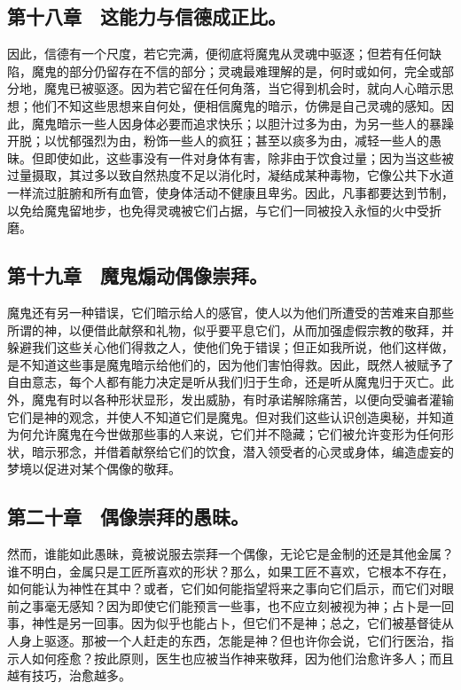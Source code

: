 \subsection{第十八章　这能力与信德成正比。}

因此，信德有一个尺度，若它完满，便彻底将魔鬼从灵魂中驱逐；但若有任何缺陷，魔鬼的部分仍留存在不信的部分；灵魂最难理解的是，何时或如何，完全或部分地，魔鬼已被驱逐。因为若它留在任何角落，当它得到机会时，就向人心暗示思想；他们不知这些思想来自何处，便相信魔鬼的暗示，仿佛是自己灵魂的感知。因此，魔鬼暗示一些人因身体必要而追求快乐；以胆汁过多为由，为另一些人的暴躁开脱；以忧郁强烈为由，粉饰一些人的疯狂；甚至以痰多为由，减轻一些人的愚昧。但即使如此，这些事没有一件对身体有害，除非由于饮食过量；因为当这些被过量摄取，其过多以致自然热度不足以消化时，凝结成某种毒物，它像公共下水道一样流过脏腑和所有血管，使身体活动不健康且卑劣。因此，凡事都要达到节制，以免给魔鬼留地步，也免得灵魂被它们占据，与它们一同被投入永恒的火中受折磨。\par


\subsection{第十九章　魔鬼煽动偶像崇拜。}

魔鬼还有另一种错误，它们暗示给人的感官，使人以为他们所遭受的苦难来自那些所谓的神，以便借此献祭和礼物，似乎要平息它们，从而加强虚假宗教的敬拜，并躲避我们这些关心他们得救之人，使他们免于错误；但正如我所说，他们这样做，是不知道这些事是魔鬼暗示给他们的，因为他们害怕得救。因此，既然人被赋予了自由意志，每个人都有能力决定是听从我们归于生命，还是听从魔鬼归于灭亡。此外，魔鬼有时以各种形状显形，发出威胁，有时承诺解除痛苦，以便向受骗者灌输它们是神的观念，并使人不知道它们是魔鬼。但对我们这些认识创造奥秘，并知道为何允许魔鬼在今世做那些事的人来说，它们并不隐藏；它们被允许变形为任何形状，暗示邪念，并借着献祭给它们的饮食，潜入领受者的心灵或身体，编造虚妄的梦境以促进对某个偶像的敬拜。\par


\subsection{第二十章　偶像崇拜的愚昧。}

然而，谁能如此愚昧，竟被说服去崇拜一个偶像，无论它是金制的还是其他金属？谁不明白，金属只是工匠所喜欢的形状？那么，如果工匠不喜欢，它根本不存在，如何能认为神性在其中？或者，它们如何能指望将来之事向它们启示，而它们对眼前之事毫无感知？因为即使它们能预言一些事，也不应立刻被视为神；占卜是一回事，神性是另一回事。因为似乎也能占卜，但它们不是神；总之，它们被基督徒从人身上驱逐。那被一个人赶走的东西，怎能是神？但也许你会说，它们行医治，指示人如何痊愈？按此原则，医生也应被当作神来敬拜，因为他们治愈许多人；而且越有技巧，治愈越多。\par

